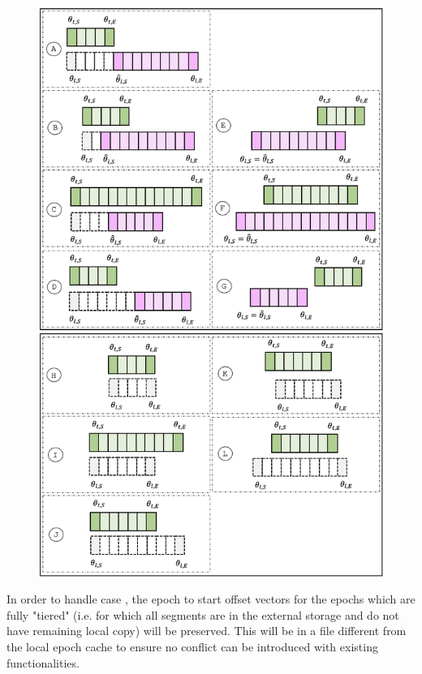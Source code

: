 \documentclass{article}
\newcommand*\circled[1]{\tikz[baseline=(char.base)]{
		\node[shape=circle,draw,inner sep=1pt] (char) {#1};}}
\begin{document}
\begin{figure}[h!]
	\centering
	\includegraphics[scale=0.6]{become-leader.png}
	\label{fig:become-leader}
\end{figure}

In order to handle case \circled{E.2}, the epoch to start offset vectors for the epochs which are fully "tiered" (i.e. for which all segments are in the external storage and do not have remaining local copy) will be preserved. This will be in a file different from the local epoch cache to ensure no conflict can be introduced with existing functionalities.
\end{document}
